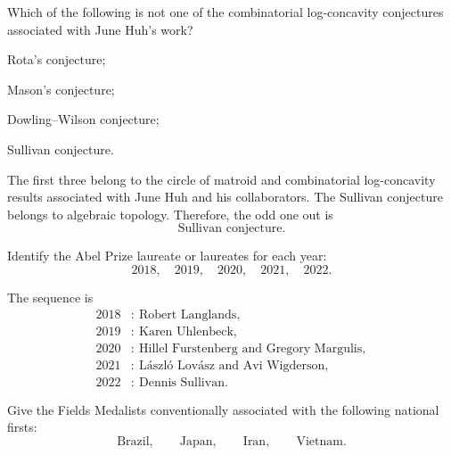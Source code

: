     \begin{expectedproblem}
        Which of the following is not one of the combinatorial log-concavity
        conjectures associated with June Huh's work?
        \begin{problemchoices}
            \item Rota's conjecture;
            \item Mason's conjecture;
            \item Dowling--Wilson conjecture;
            \item Sullivan conjecture.
        \end{problemchoices}
    \end{expectedproblem}

    \begin{solution}
        The first three belong to the circle of matroid and combinatorial
        log-concavity results associated with June Huh and his collaborators.
        The Sullivan conjecture belongs to algebraic topology. Therefore, the
        odd one out is
        \[
            \boxed{\text{Sullivan conjecture}}.
        \]
    \end{solution}

    \begin{expectedproblem}
        Identify the Abel Prize laureate or laureates for each year:
        \[
            2018,\quad 2019,\quad 2020,\quad 2021,\quad 2022.
        \]
    \end{expectedproblem}

    \begin{solution}
        The sequence is
        \[
            \boxed{
                \begin{aligned}
                    2018&:\ \text{Robert Langlands},\\
                    2019&:\ \text{Karen Uhlenbeck},\\
                    2020&:\ \text{Hillel Furstenberg and Gregory Margulis},\\
                    2021&:\ \text{L\'aszl\'o Lov\'asz and Avi Wigderson},\\
                    2022&:\ \text{Dennis Sullivan}.
                \end{aligned}
            }
        \]
    \end{solution}

    \begin{expectedproblem}
        Give the Fields Medalists conventionally associated with the following
        national firsts:
        \[
            \text{Brazil},
            \qquad
            \text{Japan},
            \qquad
            \text{Iran},
            \qquad
            \text{Vietnam}.
        \]
    \end{expectedproblem}


